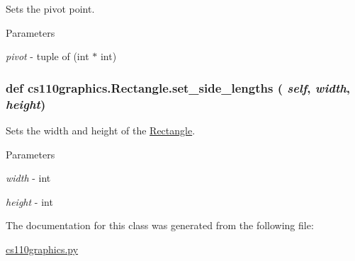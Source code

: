 Sets the pivot point. 
\begin{DoxyParams}{Parameters}
\item[{\em pivot}]-\/ tuple of (int $\ast$ int) \end{DoxyParams}
\hypertarget{classcs110graphics_1_1Rectangle_a080e6851b24278d7533e0fa9920ea036}{
\subsubsection[{set\_\-side\_\-lengths}]{\setlength{\rightskip}{0pt plus 5cm}def cs110graphics.Rectangle.set\_\-side\_\-lengths ( {\em self}, \/   {\em width}, \/   {\em height})}}
\label{classcs110graphics_1_1Rectangle_a080e6851b24278d7533e0fa9920ea036}


Sets the width and height of the \hyperlink{classcs110graphics_1_1Rectangle}{Rectangle}. 
\begin{DoxyParams}{Parameters}
\item[{\em width}]-\/ int \item[{\em height}]-\/ int \end{DoxyParams}


The documentation for this class was generated from the following file:\begin{DoxyCompactItemize}
\item 
\hyperlink{cs110graphics_8py}{cs110graphics.py}\end{DoxyCompactItemize}
